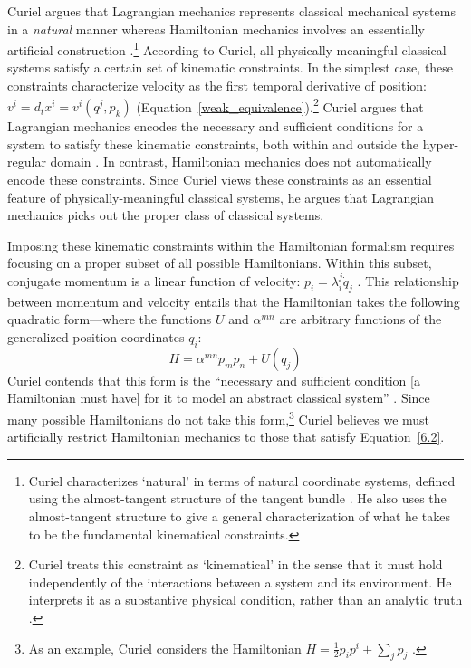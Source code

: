 \documentclass[12pt, english, twoside]{article} %
\begin{document}
Curiel argues that Lagrangian mechanics represents classical mechanical systems in a \textit{natural} manner whereas Hamiltonian mechanics involves an essentially artificial construction \parencites*[270]{Curiel}.\footnote{Curiel characterizes `natural' in terms of natural coordinate systems, defined using the almost-tangent structure of the tangent bundle \parencites*[290-291]{Curiel}. He also uses the almost-tangent structure to give a general characterization of what he takes to be the fundamental kinematical constraints.} According to Curiel, all physically-meaningful classical systems satisfy a certain set of kinematic constraints. In the simplest case, these constraints characterize velocity as the first temporal derivative of position: $v^i = d_t x^i = v^i(q^j, p_k)$ (Equation~\ref{weak_equivalence}).\footnote{Curiel treats this constraint as `kinematical' in the sense that it must hold independently of the interactions between a system and its environment. He interprets it as a substantive physical condition, rather than an analytic truth \parencites*[282]{Curiel}.} Curiel argues that Lagrangian mechanics encodes the necessary and sufficient conditions for a system to satisfy these kinematic constraints, both within and outside the hyper-regular domain \parencites*[307--308, 311]{Curiel}. In contrast, Hamiltonian mechanics does not automatically encode these constraints. Since Curiel views these constraints as an essential feature of physically-meaningful classical systems, he argues that Lagrangian mechanics picks out the proper class of classical systems. 

Imposing these kinematic constraints within the Hamiltonian formalism requires focusing on a proper subset of all possible Hamiltonians. Within this subset, conjugate momentum is a linear function of velocity: $p_i = \lambda^j_i \dot{q}_j $ \parencites*[304]{Curiel}. This relationship between momentum and velocity entails that the Hamiltonian takes the following quadratic form---where the functions $U$ and $\alpha^{m n}$ are arbitrary functions of the generalized position coordinates $q_i$:
\begin{equation} \label{6.2}
H =\alpha^{m n} p_m p_n + U (q_j) 
\end{equation}
Curiel contends that this form is the ``necessary and sufficient condition [a Hamiltonian must have] for it to model an abstract classical system'' \parencites*[305]{Curiel}. Since many possible Hamiltonians do not take this form,\footnote{As an example, Curiel considers the Hamiltonian $H = \frac{1}{2} p_i p^i + \sum_j p_j$  \parencites*[305]{Curiel}.} Curiel believes we must artificially restrict Hamiltonian mechanics to those that satisfy Equation~\ref{6.2}.
\end{document}
